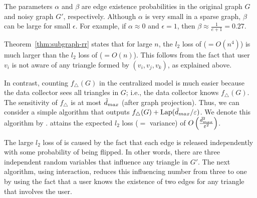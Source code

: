The parameters $\alpha$ and $\beta$ are edge existence probabilities in the original graph $G$ and noisy graph $G'$, respectively. 
Although $\alpha$ is very small in a sparse graph, $\beta$ can be large for small $\epsilon$. 
For example, if $\alpha \approx 0$ and $\epsilon=1$, then $\beta \approx \frac{1}{e+1} = 0.27$. 

Theorem~\ref{thm:subgraph-rr} states that for large $n$, the $l_2$ loss of  
($=O(n^4)$) 
is much larger than the $l_2$ loss of  ($=O(n)$). 
This follows from the fact that user $v_i$ 
is not aware of any triangle formed by $(v_i, v_j, v_k)$, as explained above. 

In contrast, counting $f_\triangle(G)$ in the centralized model is much easier because the data collector sees all triangles in $G$; i.e., the data collector knows $f_\triangle(G)$. 
The 
sensitivity of $f_\triangle$ 
is 
at most $\tilde{d}_{max}$ (after graph projection). 
Thus, 
we can consider a simple algorithm that 
outputs $f_{\triangle}(G) + \textrm{Lap}(\tilde{d}_{max}/\varepsilon)$. 
We denote this algorithm by . 
 attains the expected $l_2$ loss ($=$ variance) of $O\left(\frac{\tilde{d}_{max}^2}{\varepsilon^2}\right)$. 


The large $l_2$ loss of  is caused by the fact that 
each edge is released independently with
some probability of being flipped. 
In other words, 
there are three independent random
variables that influence 
any triangle in $G'$. 
The next algorithm,
using interaction, 
reduces 
this influencing number 
from three to one 
by using the fact that 
a user 
knows 
the existence of two edges for any triangle that involves the user. 

